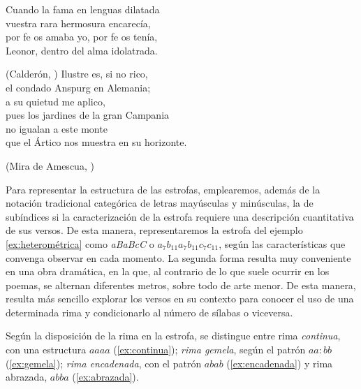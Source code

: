 \begin{exe}
	\ex\label{ex:isometrica}Cuando la fama en lenguas dilatada\\	
	vuestra rara hermosura encarecía,\\
	por fe os amaba yo, por fe os tenía,\\ 		
	Leonor, dentro del alma idolatrada.\\
	\strut\hfill(Calderón, )
	\ex\label{ex:heterométrica}Ilustre es, si no rico,\\
	el condado Anspurg en Alemania;\\
	a su quietud me aplico,\\
	pues los jardines de la gran Campania\\
	no igualan a este monte\\
	que el Ártico nos muestra en su horizonte.\\	
	\strut\hfill(Mira de Amescua, )
\end{exe}
Para representar la estructura de las estrofas, emplearemos, además de la notación tradicional categórica de letras mayúsculas y minúsculas, la de subíndices si la caracterización de la estrofa requiere una descripción cuantitativa de sus versos. De esta manera, representaremos la estrofa del ejemplo \ref{ex:heterométrica} como \textit{aBaBcC} o $a_{7} b_{11} a_{7} b_{11} c_{7} c_{11}$, según las características que convenga observar en cada momento. La segunda forma resulta muy conveniente en una obra dramática, en la que, al contrario de lo que suele ocurrir en los poemas, se alternan diferentes metros, sobre todo de arte menor. De esta manera, resulta más sencillo explorar los versos en su contexto para conocer el uso de una determinada rima y condicionarlo al número de sílabas o viceversa.

Según la disposición de la rima en la estrofa, se distingue entre rima \textit{continua}, con una estructura $aaaa$ (\ref{ex:continua}); \textit{rima gemela}, según el patrón $aa:bb$ (\ref{ex:gemela}); \textit{rima encadenada}, con el patrón $abab$ (\ref{ex:encadenada}) y rima abrazada, $abba$ (\ref{ex:abrazada}).

